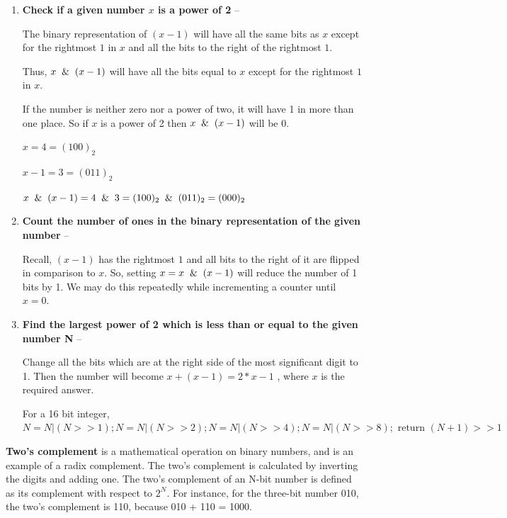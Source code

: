 \documentclass{article}
\begin{document}
    \begin{enumerate}
        \item \textbf{Check if a given number $x$ is a power of 2} --
        
        The binary representation of $(x-1)$ will have all the same bits as $x$ except for the rightmost $1$ in $x$ and all the bits to the right of the rightmost $1$. 
        
        Thus, $x \And (x-1)$ will have all the bits equal to $x$ except for the rightmost $1$ in $x$.
        
        If the number is neither zero nor a power of two, it will have 1 in more than one place. So if $x$ is a power of 2 then $x \And (x-1)$ will be 0.
         
        $x = 4 = (100)_2$
        
        $x - 1 = 3 = (011)_2$
        
        $x \And (x-1) = 4 \And 3 = (100)_2 \And (011)_2 = (000)_2$
         
         \item \textbf{Count the number of ones in the binary representation of the given number} --
         
         Recall, $(x-1)$ has the rightmost $1$ and all bits to the right of it are flipped in comparison to $x$. So, setting $x = x \And (x-1)$ will reduce the number of 1 bits by 1. We may do this repeatedly while incrementing a counter until $x = 0$.
         
         \item \textbf{Find the largest power of 2 which is less than or equal to the given number N} -- 
         
         Change all the bits which are at the right side of the most significant digit to 1. Then the number will become $x + (x-1) = 2 * x -1$ , where $x$ is the required answer.
         
        For a 16 bit integer,
        $N = N| (N>>1);
        N = N| (N>>2);
        N = N| (N>>4);
        N = N| (N>>8); \text{ return } (N+1)>>1$
         
     \end{enumerate}
    
    \textbf{Two's complement} is a mathematical operation on binary numbers, and is an example of a radix complement. The two's complement is calculated by inverting the digits and adding one. The two's complement of an N-bit number is defined as its complement with respect to $2^N$. For instance, for the three-bit number 010, the two's complement is 110, because 010 + 110 = 1000. 
\end{document}
